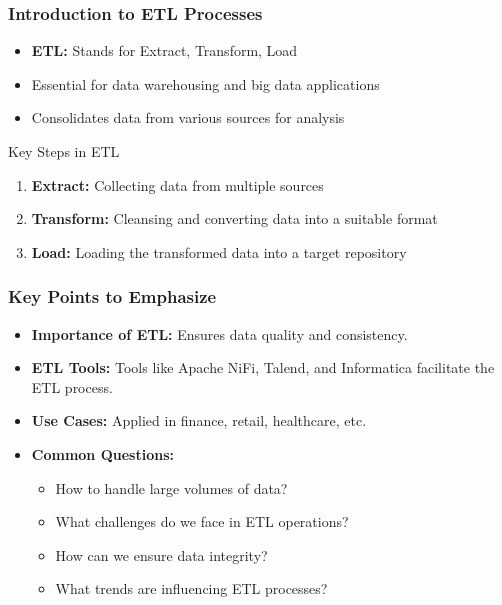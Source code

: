\documentclass[aspectratio=169]{beamer}
\begin{document}
\begin{frame}[fragile]
    \frametitle{Introduction to ETL Processes}
    \begin{itemize}
        \item \textbf{ETL:} Stands for Extract, Transform, Load
        \item Essential for data warehousing and big data applications
        \item Consolidates data from various sources for analysis
    \end{itemize}
    \begin{block}{Key Steps in ETL}
        \begin{enumerate}
            \item \textbf{Extract:} Collecting data from multiple sources
            \item \textbf{Transform:} Cleansing and converting data into a suitable format
            \item \textbf{Load:} Loading the transformed data into a target repository
        \end{enumerate}
    \end{block}
\end{frame}

\begin{frame}[fragile]
    \frametitle{Key Points to Emphasize}
    \begin{itemize}
        \item \textbf{Importance of ETL:} Ensures data quality and consistency.
        \item \textbf{ETL Tools:} Tools like Apache NiFi, Talend, and Informatica facilitate the ETL process.
        \item \textbf{Use Cases:} Applied in finance, retail, healthcare, etc.
        \item \textbf{Common Questions:}
        \begin{itemize}
            \item How to handle large volumes of data?
            \item What challenges do we face in ETL operations?
            \item How can we ensure data integrity?
            \item What trends are influencing ETL processes?
        \end{itemize}
    \end{itemize}
\end{frame}
\end{document}
